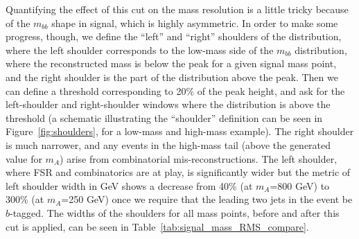  

Quantifying the effect of this cut on the mass resolution is a little tricky because of the
$m_{bb}$ shape in signal, which is highly asymmetric.  In order to make some progress, though,
we define the ``left'' and ``right'' shoulders of the distribution, where the left shoulder
corresponds to the low-mass side of the $m_{bb}$ distribution, where the reconstructed mass 
is below the peak for a given signal mass point,
and the right shoulder is the part of the distribution above the peak.  Then we can define
a threshold corresponding to 20\% of the peak height, and ask for the left-shoulder and right-shoulder
windows where the distribution is above the threshold (a schematic illustrating the ``shoulder''
definition can be seen in Figure~\ref{fig:shoulders}, for a low-mass and high-mass example).  
The right shoulder is much narrower,
and any events in the high-mass tail (above the generated value for $m_A$) arise from 
combinatorial mis-reconstructions.  The left shoulder, where FSR and combinatorics are
at play, is significantly wider but the metric of left shoulder width in GeV shows a decrease
from 40\% (at $m_A$=800 GeV) to 300\% (at $m_A$=250 GeV)
once we require that the leading two jets in the event be $b$-tagged.  The widths of the shoulders
for all mass points, before and after this cut is applied, can be seen in Table~\ref{tab:signal_mass_RMS_compare}.


